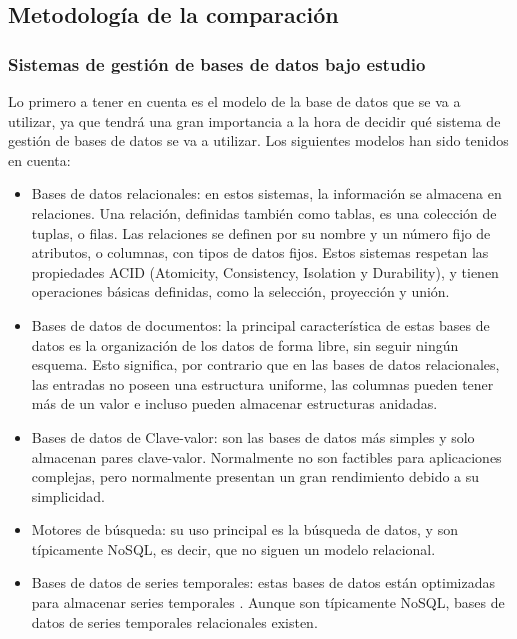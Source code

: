 \subsection{Metodología de la comparación}

\subsubsection{Sistemas de gestión de bases de datos bajo estudio}

Lo primero a tener en cuenta es el modelo de la base de datos que se va a utilizar, ya que tendrá una gran importancia
a la hora de decidir qué sistema de gestión de bases de datos se va a utilizar. Los siguientes modelos \cite{10.5555/3364297} han sido
tenidos en cuenta: 

\begin{itemize}
    \item Bases de datos relacionales: en estos sistemas, la información se almacena en relaciones. Una relación,
        definidas también como tablas, es una colección de tuplas, o filas. Las relaciones se definen por su nombre
        y un número fijo de atributos, o columnas, con tipos de datos fijos. Estos sistemas respetan las propiedades
        ACID (Atomicity, Consistency, Isolation y Durability), y tienen operaciones básicas definidas, como la selección,
        proyección y unión.
    \item Bases de datos de documentos: la principal característica de estas bases de datos es la organización de los datos
        de forma libre, sin seguir ningún esquema. Esto significa, por contrario que en las bases de datos relacionales,
        las entradas no poseen una estructura uniforme, las columnas pueden tener más de un valor e incluso pueden almacenar
        estructuras anidadas.
    \item Bases de datos de Clave-valor: son las bases de datos más simples y solo almacenan pares clave-valor. Normalmente
        no son factibles para aplicaciones complejas, pero normalmente presentan un gran rendimiento debido a su
        simplicidad.
    \item Motores de búsqueda: su uso principal es la búsqueda de datos, y son típicamente NoSQL, es decir, que no siguen
        un modelo relacional.
    \item Bases de datos de series temporales: estas bases de datos están optimizadas para almacenar series temporales \cite{influx:timeseries}.
        Aunque son típicamente NoSQL, bases de datos de series temporales relacionales existen.
\end{itemize}

